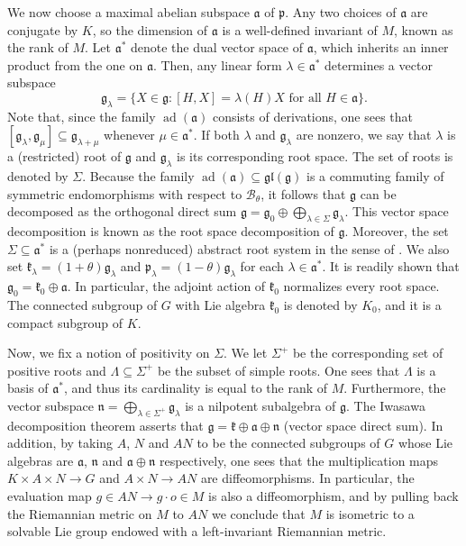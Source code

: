 \documentclass[12pt, a4paper]{amsart}
\newcommand{\g}{\mathfrak}
\newcommand{\ad}{\operatorname{ad}}
\theoremstyle{definition}
\begin{document}
We now choose a maximal abelian subspace $\g{a}$ of $\g{p}$.
Any two choices of $\g{a}$ are conjugate by $K$, so the dimension of $\g{a}$ is a well-defined invariant of $M$, known as the rank of $M$.
Let $\g{a}^{*}$ denote the dual vector space of $\g{a}$, which inherits an inner product
from the one on $\g{a}$.
Then, any linear form $\lambda \in \g{a}^{*}$ determines a vector subspace
\begin{equation*}
    \g{g}_{\lambda}
    =
    \big\{
        X\in \g{g} \colon [H,X]=\lambda(H)X \text{ for all } H\in \g{a}
    \big\}.
\end{equation*}
Note that, since the family $\ad(\g{a})$ consists of derivations,
one sees that $[\g{g}_\lambda,\g{g}_\mu]\subseteq\g{g}_{\lambda+\mu}$
whenever $\mu\in\g{a}^*$.
If both $\lambda$ and $\g{g}_{\lambda}$ are nonzero, we say that $\lambda$ is a (restricted) root of $\g{g}$ and $\g{g}_{\lambda}$ is its corresponding root space.
The set of roots is denoted by $\Sigma$.
Because the family $\ad(\g{a})\subseteq \g{gl}(\g{g})$ is a commuting family of symmetric endomorphisms with respect to $\mathcal{B}_{\theta}$, it follows that $\g{g}$ can be decomposed as the orthogonal direct sum
$
\g{g}=\g{g}_{0}\oplus \bigoplus_{\lambda\in \Sigma}\g{g}_{\lambda}.
$
This vector space decomposition is known as the root space decomposition of $\g{g}$.
Moreover, the set $\Sigma \subseteq \g{a}^{*}$ is a (perhaps nonreduced) abstract root system in the sense of \cite[Section~2.5]{knapp}.
We also set $\g{k}_{\lambda}=(1+\theta)\g{g}_{\lambda}$ and $\g{p}_{\lambda}=(1-\theta)\g{g}_{\lambda}$ for each $\lambda\in \g{a}^{*}$.
It is readily shown that $\g{g}_{0}=\g{k}_{0}\oplus \g{a}$.
In particular, the adjoint action of $\g{k}_{0}$ normalizes every root space.
The connected subgroup of $G$ with Lie algebra $\g{k}_0$ is denoted by $K_0$, and it is a compact subgroup of $K$.

Now, we fix a notion of positivity on $\Sigma$.
We let $\Sigma^{+}$ be the corresponding set of positive roots and $\Lambda \subseteq \Sigma^{+}$ be the subset of simple roots.
One sees that $\Lambda$ is a basis of $\g{a}^{*}$, and thus its cardinality is equal to the rank of $M$.
Furthermore, the vector subspace $\g{n}=\bigoplus_{\lambda \in \Sigma^{+}}\g{g}_{\lambda}$ is a nilpotent subalgebra of $\g{g}$.
The Iwasawa decomposition theorem asserts that $\g{g}=\g{k}\oplus\g{a}\oplus\g{n}$ (vector space direct sum).
In addition, by taking $A$, $N$ and $AN$ to be the connected subgroups of $G$ whose Lie algebras
are $\g{a}$, $\g{n}$ and $\g{a}\oplus\g{n}$ respectively,
one sees that the multiplication maps $K\times A\times N\to G$
and $A\times N\to AN$ are diffeomorphisms.
In particular, the evaluation map $g\in AN \to g\cdot o \in M$ is also a diffeomorphism,
and by pulling back the Riemannian metric on $M$ to $AN$
we conclude that $M$ is isometric to a solvable Lie group endowed with a left-invariant Riemannian metric.
\end{document}
